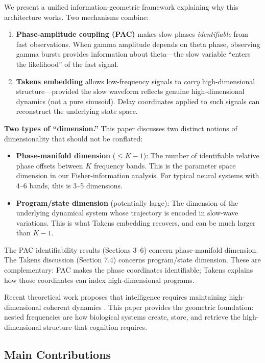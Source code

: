 \documentclass[12pt]{article}
\begin{document}
We present a unified information-geometric framework explaining why this architecture works. Two mechanisms combine:

\begin{enumerate}
    \item \textbf{Phase-amplitude coupling (PAC)} makes slow phases \emph{identifiable} from fast observations. When gamma amplitude depends on theta phase, observing gamma bursts provides information about theta---the slow variable ``enters the likelihood'' of the fast signal.

    \item \textbf{Takens embedding} allows low-frequency signals to \emph{carry} high-dimensional structure---provided the slow waveform reflects genuine high-dimensional dynamics (not a pure sinusoid). Delay coordinates applied to such signals can reconstruct the underlying state space.
\end{enumerate}

\textbf{Two types of ``dimension.''} This paper discusses two distinct notions of dimensionality that should not be conflated:
\begin{itemize}
    \item \textbf{Phase-manifold dimension} ($\leq K-1$): The number of identifiable relative phase offsets between $K$ frequency bands. This is the parameter space dimension in our Fisher-information analysis. For typical neural systems with 4--6 bands, this is 3--5 dimensions.
    \item \textbf{Program/state dimension} (potentially large): The dimension of the underlying dynamical system whose trajectory is encoded in slow-wave variations. This is what Takens embedding recovers, and can be much larger than $K-1$.
\end{itemize}
The PAC identifiability results (Sections 3--6) concern phase-manifold dimension. The Takens discussion (Section 7.4) concerns program/state dimension. These are complementary: PAC makes the phase coordinates identifiable; Takens explains how those coordinates can index high-dimensional programs.

Recent theoretical work proposes that intelligence requires maintaining high-dimensional coherent dynamics \citep{todd2026intelligence}. This paper provides the geometric foundation: nested frequencies are how biological systems create, store, and retrieve the high-dimensional structure that cognition requires.

\subsection{Main Contributions}
\end{document}
